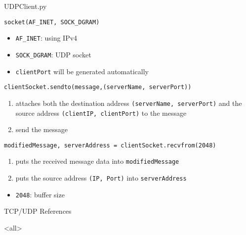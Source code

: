 \begin{frame}[t,allowframebreaks]{UDPClient.py}
  \begin{center}
  \end{center}
  \begin{iblock}{\texttt{socket(AF\_INET, SOCK\_DGRAM)}}
    \begin{itemize}
    \item \texttt{AF\_INET}: using IPv4
    \item \texttt{SOCK\_DGRAM}: UDP socket
    \item \texttt{clientPort} will be generated automatically
    \end{itemize}
  \end{iblock}
  \begin{iblock}{\texttt{clientSocket.sendto(message,(serverName, serverPort))}}
    \begin{enumerate}
    \item attaches both the destination address \texttt{(serverName, serverPort)} and the
      source address \texttt{(clientIP, clientPort)} to the message
    \item send the message
    \end{enumerate}
  \end{iblock}
  \begin{iblock}{\texttt{modifiedMessage, serverAddress = clientSocket.recvfrom(2048)}}
    \begin{enumerate}
    \item puts the received message data into \texttt{modifiedMessage}
    \item puts the source address \texttt{(IP, Port)} into \texttt{serverAddress}
    \end{enumerate}
    \begin{itemize}
    \item \texttt{2048}: buffer size
    \end{itemize}
  \end{iblock}
\end{frame}

\begin{frame}{TCP/UDP References}
  \begin{refsection}
    \nocite{wiki:tcp, wiki:udp, wiki:checksum, rfc793, rfc768, wiki:socket, hall2009beej}
    \printbibliography[heading=none]
  \end{refsection}
\end{frame}

\mode<all>

